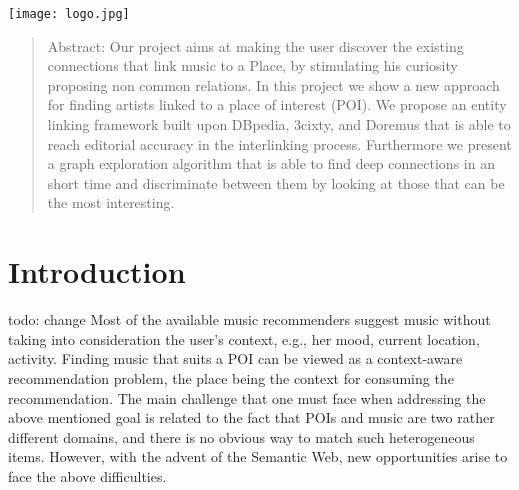 \begin{titlepage}




\texttt{[image: logo.jpg]}\\ %
 

\vfill %

\end{titlepage}
\begin{abstract}
Abstract: 
Our project aims at making the user discover the existing connections that link music to a Place, by stimulating his curiosity proposing non common relations. In this project we show a new approach for finding artists linked to a place of interest (POI). We propose an entity linking framework built upon DBpedia, 3cixty, and Doremus that is able to reach editorial accuracy in the interlinking process. Furthermore we present a graph exploration algorithm that is able to find deep connections in an short time and discriminate between them by looking at those that can be the most interesting. 
\end{abstract}
\newpage

\tableofcontents
\newpage

\section{Introduction}
todo: change
Most of the available music recommenders suggest music without taking into consideration the user’s context, e.g., her mood, current location, activity. 
Finding music that suits a POI can be viewed as a context-aware recommendation problem, the place being the context for consuming the recommendation.         
The main challenge that one must face when addressing the above mentioned goal is related to the fact that POIs and music are two rather different domains, and there is no obvious way to match such heterogeneous items. However, with the advent of the Semantic Web, new opportunities arise to face the above difficulties.  

